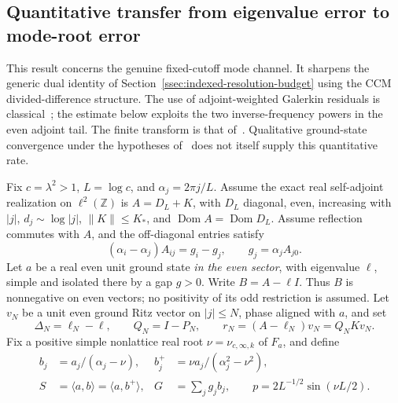 \subsection{Quantitative transfer from eigenvalue error to mode-root error}
\label{ssec:quantitative-mode-transfer}

This result concerns the genuine fixed-cutoff mode channel. It sharpens the
generic dual identity of Section~\ref{ssec:indexed-resolution-budget}
using the CCM divided-difference structure. The use of adjoint-weighted
Galerkin residuals is classical~\cite{IndexedBeckerRannacher}; the estimate
below exploits the two inverse-frequency powers in the even adjoint tail.
The finite transform is that of~\cite[Prop.~5.9]{CCM2025}. Qualitative
ground-state convergence under the hypotheses of~\cite[Thm.~6.1]{CvS2025}
does not itself supply this quantitative rate.

Fix $c=\lambda^2>1$, $L=\log c$, and $\alpha_j=2\pi j/L$.
Assume the exact real self-adjoint realization on $\ell^2(\mathbb Z)$ is
$A=D_L+K$, with $D_L$ diagonal, even, increasing with $|j|$,
$d_j\sim\log|j|$, $\|K\|\le K_*$, and
$\operatorname{Dom}A=\operatorname{Dom}D_L$.
Assume reflection commutes with $A$, and the off-diagonal entries satisfy
\[
 (\alpha_i-\alpha_j)A_{ij}=g_i-g_j,\qquad g_j=\alpha_j A_{j0}.
\]
Let $a$ be a real even unit ground state \emph{in the even sector}, with
eigenvalue $\ell$, simple and isolated there by a gap $g>0$.
Write $B=A-\ell I$. Thus $B$ is nonnegative on even vectors; no positivity
of its odd restriction is assumed. Let $v_N$ be a unit even ground Ritz
vector on $|j|\le N$, phase aligned with $a$, and set
\[
 \Delta_N=\ell_N-\ell,\qquad Q_N=I-P_N,\qquad
 r_N=(A-\ell_N)v_N=Q_NKv_N.
\]
Fix a positive simple nonlattice real root $\nu=\nu_{c,\infty,k}$ of
$F_a$, and define
\begin{align*}
 b_j&=a_j/(\alpha_j-\nu),&
 b_j^+&=\nu a_j/(\alpha_j^2-\nu^2),\\
 S&=\langle a,b\rangle=\langle a,b^+\rangle,&
 G&=\sum_j g_j b_j,\qquad p=2L^{-1/2}\sin(\nu L/2).
\end{align*}

